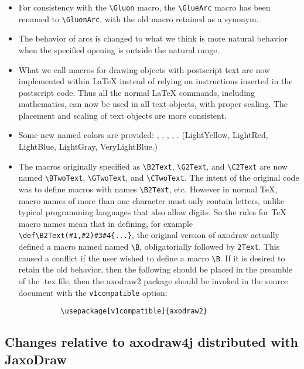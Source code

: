 \documentclass[12pt]{article}
\begin{document}
\begin{itemize}
\item For consistency with the \verb+\Gluon+ macro, the
  \verb+\GlueArc+ macro has been renamed to \verb+\GluonArc+, with the old
  macro retained as a synonym.

\item The behavior of arcs is changed to what we think is more natural
  behavior when the specified opening is outside the natural range.

\item What we call macros for drawing objects with postscript text are
  now implemented within \LaTeX{} instead of relying on instructions
  inserted in the postscript code.  Thus all the normal \LaTeX{}
  commands, including mathematics, can now be used in all text
  objects, with proper scaling.  The placement and scaling of text
  objects are more consistent. 

\item Some new named colors are provided:
  , ,
  , ,
  .  
  (LightYellow, LightRed, LightBlue, LightGray, VeryLightBlue.)

\item The macros originally specified as \verb+\B2Text+,
  \verb+\G2Text+, and \verb+\C2Text+ are now named \verb+\BTwoText+,
  \verb+\GTwoText+, and \verb+\CTwoText+.  The intent of the
    original code was to define macros with names \verb+\B2Text+, etc.
    However in normal \TeX, macro names of more than one character
    must only contain letters, unlike typical programming languages
    that also allow digits.  So the rules for \TeX{} macro names mean
    that in defining, for example \verb+\def\B2Text(#1,#2)#3#4{...}+,
    the original version of axodraw actually defined a macro named
    named \verb+\B+, obligatorially followed by \verb+2Text+.  This
    caused a conflict if the user wished to define a macro \verb+\B+.
    If it is desired to retain the old behavior, then the following
    should be placed in the preamble of the .tex file, then the
    axodraw2 package should be invoked in the source document with the
    \texttt{v1compatible} option:
    \begin{verbatim}
          \usepackage[v1compatible]{axodraw2}
    \end{verbatim}

\end{itemize}

\subsection{Changes relative to axodraw4j distributed with JaxoDraw}
\label{sec:changes.wrt.4j}
\end{document}
